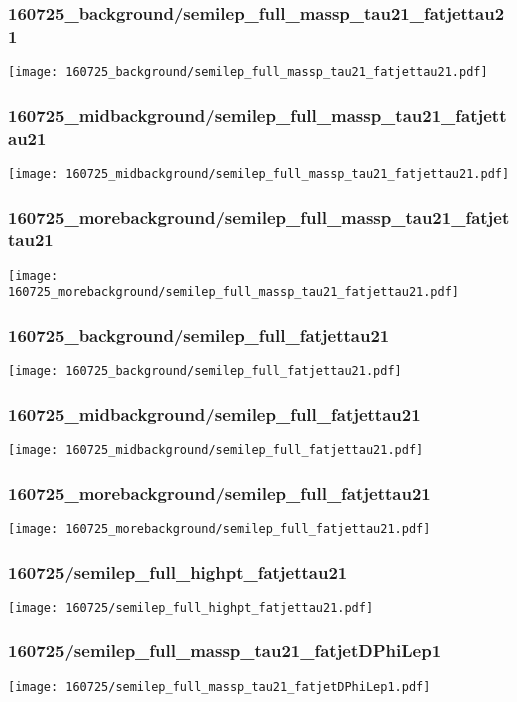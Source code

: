 \begin{frame}
   \frametitle{\small 160725\_background/semilep\_full\_massp\_tau21\_fatjettau21}
   \centering
   \texttt{[image: 160725\_background/semilep\_full\_massp\_tau21\_fatjettau21.pdf]}
\end{frame}

\begin{frame}
   \frametitle{\small 160725\_midbackground/semilep\_full\_massp\_tau21\_fatjettau21}
   \centering
   \texttt{[image: 160725\_midbackground/semilep\_full\_massp\_tau21\_fatjettau21.pdf]}
\end{frame}

\begin{frame}
   \frametitle{\small 160725\_morebackground/semilep\_full\_massp\_tau21\_fatjettau21}
   \centering
   \texttt{[image: 160725\_morebackground/semilep\_full\_massp\_tau21\_fatjettau21.pdf]}
\end{frame}

\begin{frame}
   \frametitle{\small 160725\_background/semilep\_full\_fatjettau21}
   \centering
   \texttt{[image: 160725\_background/semilep\_full\_fatjettau21.pdf]}
\end{frame}

\begin{frame}
   \frametitle{\small 160725\_midbackground/semilep\_full\_fatjettau21}
   \centering
   \texttt{[image: 160725\_midbackground/semilep\_full\_fatjettau21.pdf]}
\end{frame}

\begin{frame}
   \frametitle{\small 160725\_morebackground/semilep\_full\_fatjettau21}
   \centering
   \texttt{[image: 160725\_morebackground/semilep\_full\_fatjettau21.pdf]}
\end{frame}

\begin{frame}
   \frametitle{\small 160725/semilep\_full\_highpt\_fatjettau21}
   \centering
   \texttt{[image: 160725/semilep\_full\_highpt\_fatjettau21.pdf]}
\end{frame}

\begin{frame}
   \frametitle{\small 160725/semilep\_full\_massp\_tau21\_fatjetDPhiLep1}
   \centering
   \texttt{[image: 160725/semilep\_full\_massp\_tau21\_fatjetDPhiLep1.pdf]}
\end{frame}

